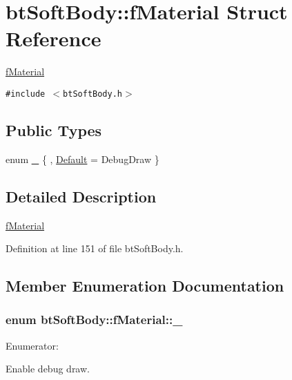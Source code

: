 \hypertarget{structbt_soft_body_1_1f_material}{
\section{btSoftBody::fMaterial Struct Reference}
\label{structbt_soft_body_1_1f_material}
}
\hyperlink{structbt_soft_body_1_1f_material}{fMaterial}  


{\tt \#include $<$btSoftBody.h$>$}

\subsection*{Public Types}
\begin{CompactItemize}
\item 
enum \hyperlink{structbt_soft_body_1_1f_material_6cc6df1c89b51761f169222062ec5ca8}{\_\-} \{ , \hyperlink{structbt_soft_body_1_1f_material_6cc6df1c89b51761f169222062ec5ca8f84f8e3bf24e47554c5278e654ddc0bb}{Default} =  DebugDraw
 \}
\end{CompactItemize}


\subsection{Detailed Description}
\hyperlink{structbt_soft_body_1_1f_material}{fMaterial} 

Definition at line 151 of file btSoftBody.h.

\subsection{Member Enumeration Documentation}
\hypertarget{structbt_soft_body_1_1f_material_6cc6df1c89b51761f169222062ec5ca8}{
\subsubsection[\_\-]{\setlength{\rightskip}{0pt plus 5cm}enum {\bf btSoftBody::fMaterial::\_\-}}}
\label{structbt_soft_body_1_1f_material_6cc6df1c89b51761f169222062ec5ca8}


\begin{Desc}
\item[Enumerator: ]\par
\begin{description}
\item[{\em 
\hypertarget{structbt_soft_body_1_1f_material_6cc6df1c89b51761f169222062ec5ca8f84f8e3bf24e47554c5278e654ddc0bb}{
Default}
\label{structbt_soft_body_1_1f_material_6cc6df1c89b51761f169222062ec5ca8f84f8e3bf24e47554c5278e654ddc0bb}
}]Enable debug draw. \end{description}
\end{Desc}



